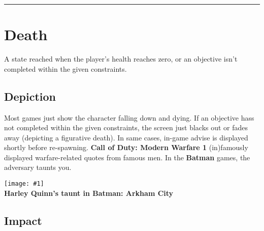 \documentclass[12pt]{article}
\newcommand{\drawline}{\vspace{2mm}\hrule}
\newcommand{\fig}[3]{\begin{center} \texttt{[image: \#1]}\\ \textbf{#3} \end{center}}
\begin{document}
\drawline

\section{Death}

A state reached when the player's health reaches zero, or an objective isn't completed within the given constraints.

\subsection{Depiction}

Most games just show the character falling down and dying. If an objective hass not completed within the given constraints, the screen just blacks out or fades away (depicting a figurative death). In same cases, in-game advise is displayed shortly before re-spawning. \textbf{Call of Duty: Modern Warfare 1} (in)famously displayed warfare-related quotes from famous men. In the \textbf{Batman} games, the adversary taunts you.

\fig{batman_taunt.jpg}{0.3}{Harley Quinn's taunt in Batman: Arkham City} 


\subsection{Impact}
\end{document}
